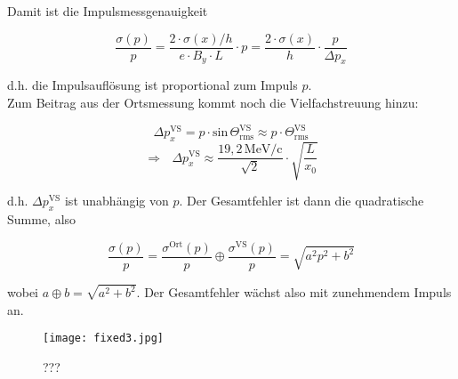 Damit ist die Impulsmessgenauigkeit

\[ \frac{\sigma(p)}{p} = \frac{2\cdot\sigma(x)/h}{e\cdot B_y\cdot L}\cdot p =
\frac{2\cdot\sigma(x)}{h}\cdot \frac{p}{\Delta p_x} \]

d.h. die Impulsauflösung ist proportional zum Impuls $p$.
\\
Zum Beitrag aus der Ortsmessung kommt noch die Vielfachstreuung hinzu:

\[\Delta p_x^{\text{VS}} = p\cdot \text{sin}\,\Theta^{\text{VS}}_{\text{rms}} \approx p \cdot
\Theta^{\text{VS}}_{\text{rms}} \]
\[ \Rightarrow~~~ \Delta p_x^{\text{VS}} \approx \frac{19{,}2\,\text{MeV/c}}{\sqrt{2}}\cdot
\sqrt{\frac{L}{x_0}} \]

d.h. $\Delta p_x^{\text{VS}}$ ist unabhängig von $p$. Der Gesamtfehler ist dann die quadratische
Summe, also

\[ \frac{\sigma(p)}{p} = \frac{\sigma^{\text{Ort}}(p)}{p} \oplus
\frac{\sigma^{\text{VS}}(p)}{p} = \sqrt{a^2p^2+b^2}\]

wobei $a\oplus b = \sqrt{a^2+b^2}$. Der Gesamtfehler wächst also mit zunehmendem Impuls an.

\begin{figure}[H]
	\centering
	\texttt{[image: fixed3.jpg]}
	\caption{	 ???}
	\label{fixed3}
\end{figure}